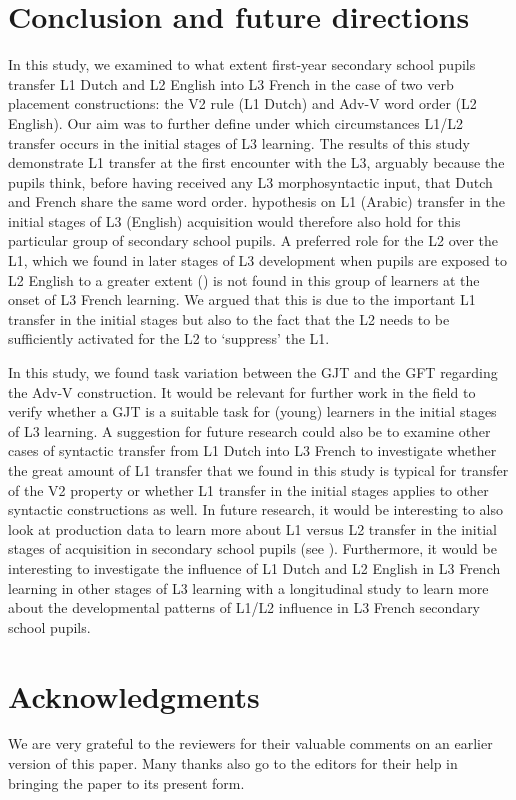 \documentclass[output=paper,modfonts,nonflat, newtxmath]{langsci/langscibook}
\begin{document}
\section{{Conclusion} {and} {future} {directions}}
\label{sec:stadt:6}

In this study, we examined to what extent first-year secondary school pupils transfer L1 Dutch and L2 English into L3 French in the case of two verb placement constructions: the V2 rule (L1 Dutch) and Adv-V word order (L2 English). Our aim was to further define under which circumstances L1/L2 transfer occurs in the initial stages of L3 learning. The results of this study demonstrate L1 transfer at the first encounter with the L3, arguably because the pupils think, before having received any L3 morphosyntactic input, that Dutch and French share the same word order.  hypothesis on L1 (Arabic) transfer in the initial stages of L3 (English) acquisition would therefore also hold for this particular group of secondary school pupils. A preferred role for the L2 over the L1, which we found in later stages of L3 development when pupils are exposed to L2 English to a greater extent (\citealt{StadtEtAl2016, StadtEtAl2018Exposure}) is not found in this group of learners at the onset of L3 French learning. We argued that this is due to the important L1 transfer in the initial stages but also to the fact that the L2 needs to be sufficiently activated for the L2 to ‘suppress’ the L1.

  In this study, we found task variation between the GJT and the GFT regarding the Adv-V construction. It would be relevant for further work in the field to verify whether a GJT is a suitable task for (young) learners in the initial stages of L3 learning. A suggestion for future research could also be to examine other cases of syntactic transfer from L1 Dutch into L3 French to investigate whether the great amount of L1 transfer that we found in this study is typical for transfer of the V2 property or whether L1 transfer in the initial stages applies to other syntactic constructions as well. In future research, it would be interesting to also look at production data to learn more about L1 versus L2 transfer in the initial stages of acquisition in secondary school pupils (see \citealt{FalkEtAl2015}). Furthermore, it would be interesting to investigate the influence of L1 Dutch and L2 English in L3 French learning in other stages of L3 learning with a longitudinal study to learn more about the developmental patterns of L1/L2 influence in L3 French secondary school pupils.

\section{Acknowledgments}

We are very grateful to the reviewers for their valuable comments on an earlier version of this paper. Many thanks also go to the editors for their help in bringing the paper to its present form.
\sloppy\printbibliography[heading=subbibliography,notkeyword=this]
\end{document}
